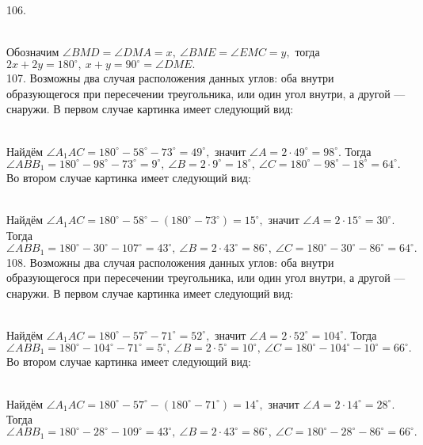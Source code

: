 106. \begin{figure}[ht!]
\end{figure}\\
Обозначим $\angle BMD=\angle DMA=x,\ \angle BME=\angle EMC=y,$ тогда $2x+2y=180^\circ,\ x+y=90^\circ=\angle DME.$\\
107. Возможны два случая расположения данных углов: оба внутри образующегося при пересечении треугольника, или один угол внутри, а другой --- снаружи. В первом случае картинка имеет следующий вид:
\begin{figure}[ht!]
\end{figure}\\
Найдём $\angle A_1AC=180^\circ-58^\circ-73^\circ=49^\circ,$ значит $\angle A=2\cdot49^\circ=98^\circ.$ Тогда $\angle ABB_1=180^\circ-98^\circ-73^\circ=9^\circ,\ \angle B=2\cdot9^\circ=18^\circ,\ \angle C=180^\circ-98^\circ-18^\circ=64^\circ.$\\
Во втором случае картинка имеет следующий вид:
\begin{figure}[ht!]
\end{figure}\\
Найдём $\angle A_1AC=180^\circ-58^\circ-(180^\circ-73^\circ)=15^\circ,$ значит $\angle A=2\cdot15^\circ=30^\circ.$ Тогда $\angle ABB_1=180^\circ-30^\circ-107^\circ=43^\circ,\ \angle B=2\cdot43^\circ=86^\circ,\ \angle C=180^\circ-30^\circ-86^\circ=64^\circ.$\\
108. Возможны два случая расположения данных углов: оба внутри образующегося при пересечении треугольника, или один угол внутри, а другой --- снаружи. В первом случае картинка имеет следующий вид:
\begin{figure}[ht!]
\end{figure}\\
Найдём $\angle A_1AC=180^\circ-57^\circ-71^\circ=52^\circ,$ значит $\angle A=2\cdot52^\circ=104^\circ.$ Тогда $\angle ABB_1=180^\circ-104^\circ-71^\circ=5^\circ,\ \angle B=2\cdot5^\circ=10^\circ,\ \angle C=180^\circ-104^\circ-10^\circ=66^\circ.$\\
Во втором случае картинка имеет следующий вид:\\
\begin{figure}[ht!]
\end{figure}\\
Найдём $\angle A_1AC=180^\circ-57^\circ-(180^\circ-71^\circ)=14^\circ,$ значит $\angle A=2\cdot14^\circ=28^\circ.$ Тогда $\angle ABB_1=180^\circ-28^\circ-109^\circ=43^\circ,\ \angle B=2\cdot43^\circ=86^\circ,\ \angle C=180^\circ-28^\circ-86^\circ=66^\circ.$\\
